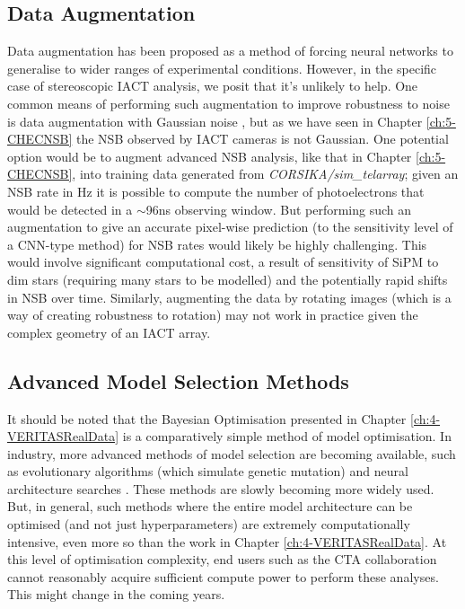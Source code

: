 \subsection{Data Augmentation}
Data augmentation has been proposed \cite{aug} as a method of forcing neural networks to generalise to wider ranges of experimental conditions. However, in the specific case of stereoscopic IACT analysis, we posit that it's unlikely to help. One common means of performing such augmentation to improve robustness to noise is data augmentation with Gaussian noise \cite{bayesdeblend}, but as we have seen in Chapter \ref{ch:5-CHECNSB} the NSB observed by IACT cameras is not Gaussian. One potential option would be to augment advanced NSB analysis, like that in Chapter \ref{ch:5-CHECNSB}, into training data generated from \textit{CORSIKA/sim\_telarray}; given an NSB rate in Hz it is possible to compute the number of photoelectrons that would be detected in a $\sim$96ns observing window. But performing such an augmentation to give an accurate pixel-wise prediction (to the sensitivity level of a CNN-type method) for NSB rates would likely be highly challenging. This would involve significant computational cost, a result of  sensitivity of SiPM to dim stars (requiring many stars to be modelled) and the potentially rapid shifts in NSB over time. Similarly, augmenting the data by rotating images (which is a way of creating robustness to rotation) may not work in practice given the complex geometry of an IACT array.

\subsection{Advanced Model Selection Methods}

It should be noted that the Bayesian Optimisation presented in Chapter \ref{ch:4-VERITASRealData} is a comparatively simple method of model optimisation. In industry, more advanced methods of model selection are becoming available, such as evolutionary algorithms \cite{evodeep} (which simulate genetic mutation) and neural architecture searches \cite{neural}. These methods are slowly becoming more widely used. But, in general, such methods where the entire model architecture can be optimised (and not just hyperparameters) are extremely computationally intensive, even more so than the work in Chapter \ref{ch:4-VERITASRealData}. At this level of optimisation complexity, end users such as the CTA collaboration cannot reasonably acquire sufficient compute power to perform these analyses. This might change in the coming years.

